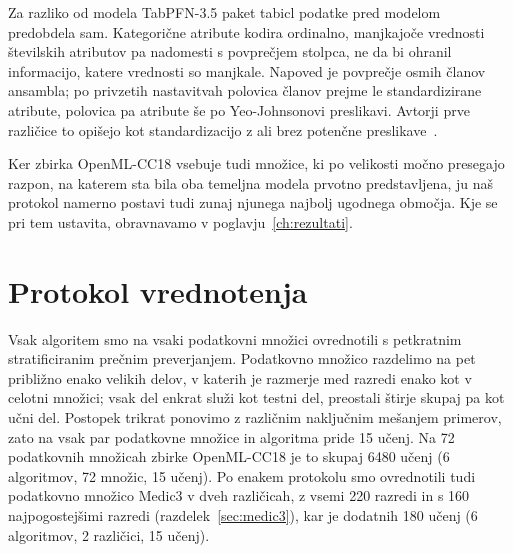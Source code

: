 \documentclass[a4paper,12pt,openright]{book}
\begin{document}
Za razliko od modela TabPFN-3.5 paket tabicl podatke pred modelom predobdela
sam. Kategorične atribute kodira ordinalno, manjkajoče vrednosti številskih
atributov pa nadomesti s povprečjem stolpca, ne da bi ohranil informacijo,
katere vrednosti so manjkale. Napoved je povprečje osmih članov ansambla; po
privzetih nastavitvah polovica članov prejme le standardizirane atribute,
polovica pa atribute še po Yeo-Johnsonovi preslikavi. Avtorji prve različice to
opišejo kot standardizacijo z ali brez potenčne preslikave~\cite{qu2025tabicl}.

Ker zbirka OpenML-CC18 vsebuje tudi množice, ki po velikosti močno presegajo
razpon, na katerem sta bila oba temeljna modela prvotno predstavljena, ju naš
protokol namerno postavi tudi zunaj njunega najbolj ugodnega območja. Kje se pri
tem ustavita, obravnavamo v poglavju~\ref{ch:rezultati}.

\section{Protokol vrednotenja}
\label{sec:protokol}

Vsak algoritem smo na vsaki podatkovni množici ovrednotili s petkratnim
stratificiranim prečnim preverjanjem. Podatkovno množico razdelimo na pet približno enako velikih
delov, v katerih je razmerje med razredi enako kot v celotni množici; vsak del
enkrat služi kot testni del, preostali štirje skupaj pa kot učni del. Postopek
trikrat ponovimo z različnim naključnim mešanjem primerov, zato na vsak par
podatkovne množice in algoritma pride 15 učenj. Na 72 podatkovnih množicah
zbirke OpenML-CC18 je to skupaj 6480 učenj (6 algoritmov, 72 množic, 15 učenj).
Po enakem protokolu smo ovrednotili tudi podatkovno množico Medic3 v dveh
različicah, z vsemi 220 razredi in s 160 najpogostejšimi razredi
(razdelek~\ref{sec:medic3}), kar je dodatnih 180 učenj (6 algoritmov,
2 različici, 15 učenj).
\end{document}
